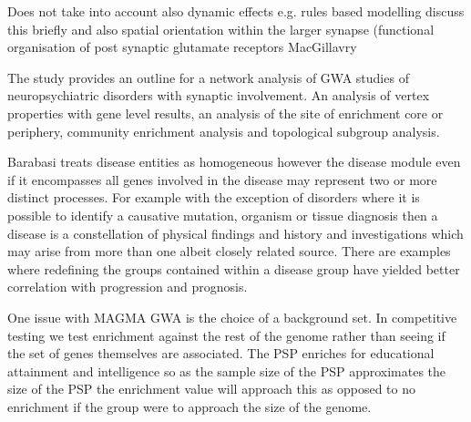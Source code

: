 Does not take into account also dynamic effects e.g. rules based modelling discuss this briefly and also spatial orientation within the larger synapse (functional organisation of post synaptic glutamate receptors MacGillavry

The study provides an outline for a network analysis of GWA studies of neuropsychiatric disorders with synaptic involvement. An analysis of vertex properties with gene level results, an analysis of the site of enrichment core or periphery, community enrichment analysis and topological subgroup analysis. 

Barabasi treats disease entities as homogeneous however the disease module even if it encompasses all genes involved in the disease may represent two or more distinct processes. For example with the exception of disorders where it is possible to identify a causative mutation, organism or tissue diagnosis then a disease is a constellation of physical findings and history and investigations which may arise from more than one albeit closely related source. There are examples where redefining the groups contained within a disease group have yielded better correlation with progression and prognosis. 

One issue with MAGMA GWA is the choice of a background set. In competitive testing we test enrichment against the rest of the genome rather than seeing if the set of genes themselves are associated. The PSP enriches for educational attainment and intelligence so as the sample size of the PSP approximates the size of the PSP the enrichment value will approach this as opposed to no enrichment if the group were to approach the size of the genome. 


